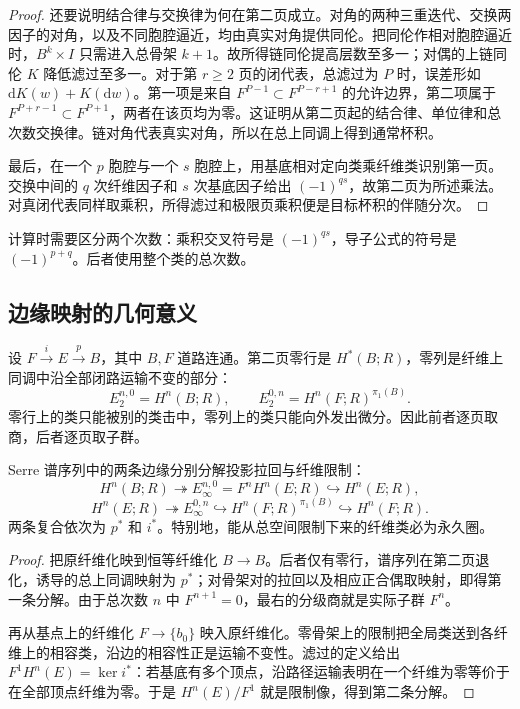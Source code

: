 \begin{proof}
	还要说明结合律与交换律为何在第二页成立。对角的两种三重迭代、交换两因子的对角，以及不同胞腔逼近，均由真实对角提供同伦。把同伦作相对胞腔逼近时，\(B^k\times I\) 只需进入总骨架 \(k+1\)。故所得链同伦提高层数至多一；对偶的上链同伦 \(K\) 降低滤过至多一。对于第 \(r\ge2\) 页的闭代表，总滤过为 \(P\) 时，误差形如 \(\mathrm dK(w)+K(\mathrm dw)\)。第一项是来自 \(F^{P-1}\subset F^{P-r+1}\) 的允许边界，第二项属于 \(F^{P+r-1}\subset F^{P+1}\)，两者在该页均为零。这证明从第二页起的结合律、单位律和总次数交换律。链对角代表真实对角，所以在总上同调上得到通常杯积。

	最后，在一个 \(p\) 胞腔与一个 \(s\) 胞腔上，用基底相对定向类乘纤维类识别第一页。交换中间的 \(q\) 次纤维因子和 \(s\) 次基底因子给出 \((-1)^{qs}\)，故第二页为所述乘法。对真闭代表同样取乘积，所得滤过和极限页乘积便是目标杯积的伴随分次。
\end{proof}

计算时需要区分两个次数：乘积交叉符号是 \((-1)^{qs}\)，导子公式的符号是 \((-1)^{p+q}\)。后者使用整个类的总次数。

\subsection{边缘映射的几何意义}
\label{g2:subsec:1102:02}

设 \(F\xrightarrow{i}E\xrightarrow{p}B\)，其中 \(B,F\) 道路连通。第二页零行是 \(H^*(B;R)\)，零列是纤维上同调中沿全部闭路运输不变的部分：
\[
	E_2^{n,0}=H^n(B;R),\qquad E_2^{0,n}=H^n(F;R)^{\pi_1(B)}.
\]
零行上的类只能被别的类击中，零列上的类只能向外发出微分。因此前者逐页取商，后者逐页取子群。

\begin{proposition}\label{g2:prop:serre-edge-maps}
	Serre 谱序列中的两条边缘分别分解投影拉回与纤维限制：
	\[
		H^n(B;R)\twoheadrightarrow E_\infty^{n,0}=F^nH^n(E;R)\hookrightarrow H^n(E;R),
	\]
	\[
		H^n(E;R)\twoheadrightarrow E_\infty^{0,n}\hookrightarrow H^n(F;R)^{\pi_1(B)}\hookrightarrow H^n(F;R).
	\]
	两条复合依次为 \(p^*\) 和 \(i^*\)。特别地，能从总空间限制下来的纤维类必为永久圈。
\end{proposition}
\begin{proof}
	把原纤维化映到恒等纤维化 \(B\to B\)。后者仅有零行，谱序列在第二页退化，诱导的总上同调映射为 \(p^*\)；对骨架对的拉回以及相应正合偶取映射，即得第一条分解。由于总次数 \(n\) 中 \(F^{n+1}=0\)，最右的分级商就是实际子群 \(F^n\)。

	再从基点上的纤维化 \(F\to\{b_0\}\) 映入原纤维化。零骨架上的限制把全局类送到各纤维上的相容类，沿边的相容性正是运输不变性。滤过的定义给出 \(F^1H^n(E)=\ker i^*\)：若基底有多个顶点，沿路径运输表明在一个纤维为零等价于在全部顶点纤维为零。于是 \(H^n(E)/F^1\) 就是限制像，得到第二条分解。
\end{proof}

